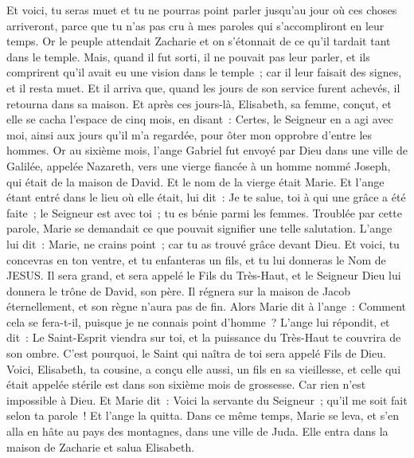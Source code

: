 \begin{multicols}{2}
Et voici, tu seras muet et tu ne pourras point parler jusqu'au jour où ces choses arriveront, parce que tu n'as pas cru à mes paroles qui s'accompliront en leur temps.
Or le peuple attendait Zacharie et on s'étonnait de ce qu'il tardait tant dans le temple.
Mais, quand il fut sorti, il ne pouvait pas leur parler, et ils comprirent qu'il avait eu une vision dans le temple~; car il leur faisait des signes, et il resta muet.
Et il arriva que, quand les jours de son service furent achevés, il retourna dans sa maison.
Et après ces jours-là, Elisabeth, sa femme, conçut, et elle se cacha l'espace de cinq mois, en disant~:
Certes, le Seigneur en a agi avec moi, ainsi aux jours qu'il m'a regardée, pour ôter mon opprobre d'entre les hommes.
Or au sixième mois, l'ange Gabriel fut envoyé par Dieu dans une ville de Galilée, appelée Nazareth,
vers une vierge fiancée à un homme nommé Joseph, qui était de la maison de David. Et le nom de la vierge était Marie.
Et l'ange étant entré dans le lieu où elle était, lui dit~: Je te salue, toi à qui une grâce a été faite~; le Seigneur est avec toi~; tu es bénie parmi les femmes.
Troublée par cette parole, Marie se demandait ce que pouvait signifier une telle salutation.
L'ange lui dit~: Marie, ne crains point~; car tu as trouvé grâce devant Dieu.
Et voici, tu concevras en ton ventre, et tu enfanteras un fils, et tu lui donneras le Nom de JESUS.
Il sera grand, et sera appelé le Fils du Très-Haut, et le Seigneur Dieu lui donnera le trône de David, son père.
Il régnera sur la maison de Jacob éternellement, et son règne n'aura pas de fin.
Alors Marie dit à l'ange~: Comment cela se fera-t-il, puisque je ne connais point d'homme~?
L'ange lui répondit, et dit~: Le Saint-Esprit viendra sur toi, et la puissance du Très-Haut te couvrira de son ombre. C'est pourquoi, le Saint qui naîtra de toi sera appelé Fils de Dieu.
Voici, Elisabeth, ta cousine, a conçu elle aussi, un fils en sa vieillesse, et celle qui était appelée stérile est dans son sixième mois de grossesse.
Car rien n'est impossible à Dieu.
Et Marie dit~: Voici la servante du Seigneur~; qu'il me soit fait selon ta parole~! Et l'ange la quitta.
Dans ce même temps, Marie se leva, et s'en alla en hâte au pays des montagnes, dans une ville de Juda.
Elle entra dans la maison de Zacharie et salua Elisabeth.

\end{multicols}
